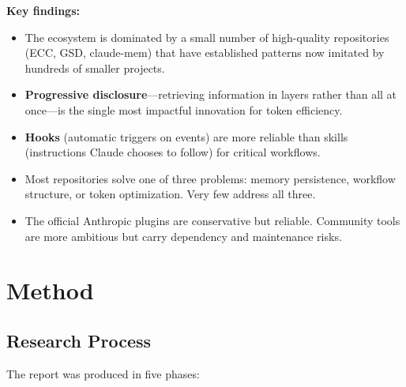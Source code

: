 \documentclass[11pt,a4paper]{article}
\begin{document}
\textbf{Key findings:}
\begin{itemize}
  \item The ecosystem is dominated by a small number of high-quality repositories (ECC, GSD, claude-mem) that have established patterns now imitated by hundreds of smaller projects.
  \item \textbf{Progressive disclosure}---retrieving information in layers rather than all at once---is the single most impactful innovation for token efficiency.
  \item \textbf{Hooks} (automatic triggers on events) are more reliable than skills (instructions Claude chooses to follow) for critical workflows.
  \item Most repositories solve one of three problems: memory persistence, workflow structure, or token optimization. Very few address all three.
  \item The official Anthropic plugins are conservative but reliable. Community tools are more ambitious but carry dependency and maintenance risks.
\end{itemize}

\newpage

\section{Method}

\subsection{Research Process}

The report was produced in five phases:
\end{document}

